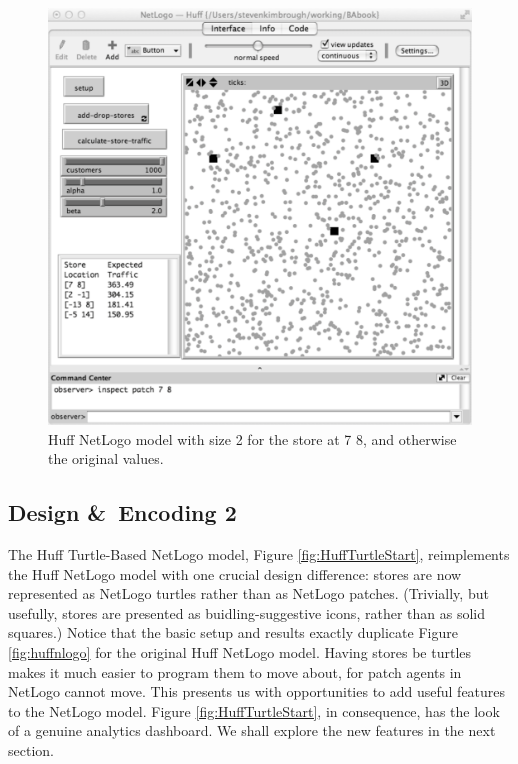 \begin{figure}[htbp] %
   \centering
   \includegraphics[width=\textwidth]{figures/Huff_increased_store_size.pdf}  
   \caption{Huff NetLogo model with size 2 for the store at 7 8, and otherwise the original values.} %
   \label{fig:Huff_increased_store_size}
\end{figure}

\newpage\clearpage

\subsection{Design \&\ Encoding 2}


The Huff Turtle-Based NetLogo model, Figure \ref{fig:HuffTurtleStart}, reimplements the Huff NetLogo model with one crucial design difference: stores are now represented as NetLogo turtles rather than as NetLogo patches. (Trivially, but usefully, stores are presented as buidling-suggestive icons, rather than as solid squares.) Notice that the basic setup and results exactly duplicate Figure \ref{fig:huffnlogo} for the original Huff NetLogo model.   Having stores be turtles makes it much easier to program them to move about, for patch agents in NetLogo cannot move. This presents us with opportunities to add useful features to the NetLogo model. Figure \ref{fig:HuffTurtleStart}, in consequence, has the look of a genuine analytics dashboard. We shall explore the new features in the next section. 


